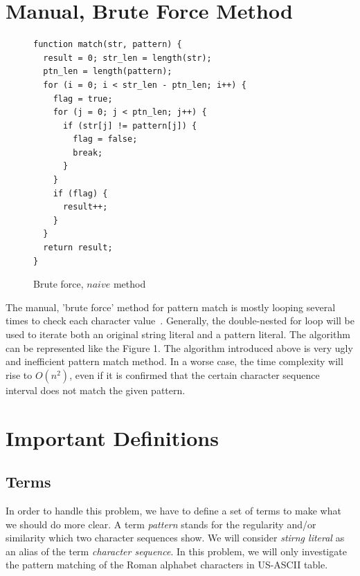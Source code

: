 \documentclass{acm_proc_article-sp}
\begin{document}
\section{Manual, Brute Force Method}
\begin{figure}
\caption{Brute force, $naive$ method}
\begin{lstlisting}
function match(str, pattern) {
  result = 0; str_len = length(str);
  ptn_len = length(pattern);
  for (i = 0; i < str_len - ptn_len; i++) {
    flag = true;
    for (j = 0; j < ptn_len; j++) {
      if (str[j] != pattern[j]) {
        flag = false;
        break;
      }
    }
    if (flag) {
      result++;
    }
  }
  return result;
}
\end{lstlisting}
\end{figure}

\begin{flushleft}
The manual, 'brute force' method for pattern match is mostly looping several times to check each character value~\cite{Fast}. Generally, the double-nested for loop will be used to iterate both an original string literal and a pattern literal. The algorithm can be represented like the Figure 1. The algorithm introduced above is very ugly and inefficient pattern match method. In a worse case, the time complexity will rise to $O(n^2)$, even if it is confirmed that the certain character sequence interval does not match the given pattern.
\end{flushleft}

\section{Important Definitions}
\subsection{Terms}
\begin{flushleft}
In order to handle this problem, we have to define a set of terms to make what we should do more clear. A term \textit{pattern} stands for the regularity and/or similarity which two character sequences show. We will consider \textit{stirng literal} as an alias of the term \textit{character sequence}. In this problem, we will only investigate the pattern matching of the Roman alphabet characters in US-ASCII table.
\end{flushleft}
\end{document}
